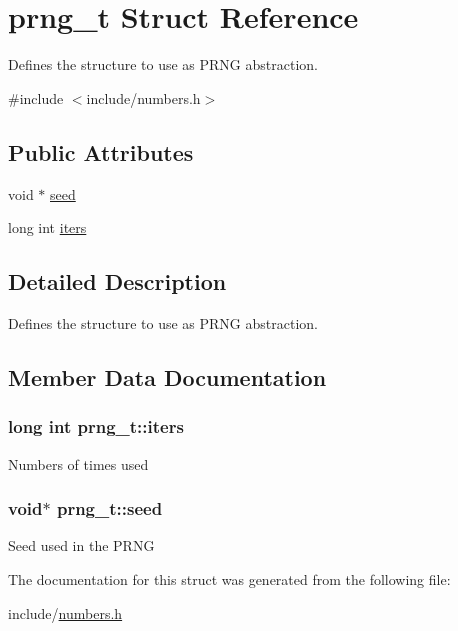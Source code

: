 \hypertarget{structprng__t}{
\section{prng\_\-t Struct Reference}
\label{structprng__t}
}


Defines the structure to use as PRNG abstraction.  


{\ttfamily \#include $<$include/numbers.h$>$}\subsection*{Public Attributes}
\begin{DoxyCompactItemize}
\item 
void $\ast$ \hyperlink{structprng__t_ad4dba91a35b00177731de6b2abbed4e0}{seed}
\item 
long int \hyperlink{structprng__t_af1d64cdb6a362d8d1f094ae91d5ef5c2}{iters}
\end{DoxyCompactItemize}


\subsection{Detailed Description}
Defines the structure to use as PRNG abstraction. 

\subsection{Member Data Documentation}
\hypertarget{structprng__t_af1d64cdb6a362d8d1f094ae91d5ef5c2}{
\subsubsection[{iters}]{\setlength{\rightskip}{0pt plus 5cm}long int {\bf prng\_\-t::iters}}}
\label{structprng__t_af1d64cdb6a362d8d1f094ae91d5ef5c2}
Numbers of times used \hypertarget{structprng__t_ad4dba91a35b00177731de6b2abbed4e0}{
\subsubsection[{seed}]{\setlength{\rightskip}{0pt plus 5cm}void$\ast$ {\bf prng\_\-t::seed}}}
\label{structprng__t_ad4dba91a35b00177731de6b2abbed4e0}
Seed used in the PRNG 

The documentation for this struct was generated from the following file:\begin{DoxyCompactItemize}
\item 
include/\hyperlink{numbers_8h}{numbers.h}\end{DoxyCompactItemize}
